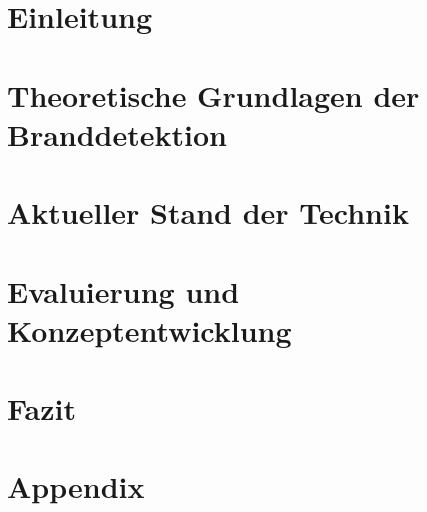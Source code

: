\documentclass[a4paper,12pt,oneside]{report}
\begin{document}
\begin{sloppypar}








\setcounter{page}{0} %
\part{Einleitung}\label{pt:einleitung}


\part{Theoretische Grundlagen der Branddetektion}\label{pt:grundlagen}


\part{Aktueller Stand der Technik}\label{pt:standdertechnik}


\part{Evaluierung und Konzeptentwicklung}\label{pt:evaluierungKonzeptentwicklung}


\part{Fazit}\label{pt:diskussionFazit}


\part{Appendix}\label{pt:appendix}
\printbibliography

\end{sloppypar}
\end{document}
